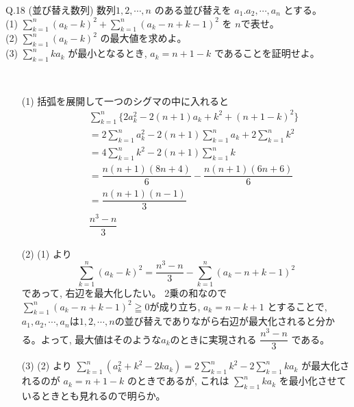 \documentclass[twocolumn]{jsarticle}
\newcommand{\thm}{\begin{itembox}[l]}
\newcommand{\disp}{\displaystyle}
\newcommand{\enthm}{\end{itembox}\\}
\renewcommand{\geq}{\geqq}
\begin{document}
\thm{Q.18 (並び替え数列)}
数列$1,2,\cdots, n$ のある並び替えを $a_1.a_2,\cdots , a_n$ とする。\\
(1) $\disp\sum_{k=1}^n (a_k-k)^2 + \disp\sum_{k=1}^n (a_k-n+k-1)^2$ を $n$で表せ。\\
(2) $\disp\sum_{k=1}^n(a_k-k)^2$ の最大値を求めよ。\\
(3) $\disp\sum_{k=1}^nka_k$ が最小となるとき, $a_k=n+1-k$ であることを証明せよ。
\enthm
\begin{enumerate}
\item[(1)] 括弧を展開して一つのシグマの中に入れると 
\begin{eqnarray*}
&&\disp\sum_{k=1}^n \{2a_k^2-2(n+1)a_k + k^2 + (n+1-k)^2 \}\\
&&=2\disp\sum_{k=1}^na_k^2 -2(n+1)\disp\sum_{k=1}^na_k + 2\disp\sum_{k=1}^n k^2\\
&&=4\disp\sum_{k=1}^nk^2 - 2(n+1) \disp\sum_{k=1}^nk\\
&&=\dfrac{n(n+1)(8n+4)}{6} - \dfrac{n(n+1)(6n+6)}{6}\\
&&=\dfrac{n(n+1)(n-1)}{3}\\
&&\dfrac{n^3-n}{3}
\end{eqnarray*}
\item[(2)] (1) より
\[\disp\sum_{k=1}^n(a_k-k)^2 = \dfrac{n^3-n}{3}-\disp\sum_{k=1}^n (a_k-n+k-1)^2\]
であって, 右辺を最大化したい。 2乗の和なので$\disp\sum_{k=1}^n (a_k-n+k-1)^2\geq 0$が成り立ち, $a_k=n-k+1$ とすることで, $a_1,a_2,\cdots, a_n$は$1,2,\cdots ,n$の並び替えでありながら右辺が最大化されると分かる。よって, 最大値はそのような$a_k$のときに実現される $\dfrac{n^3-n}{3}$ である。
\item[(3)] (2) より $\disp\sum_{k=1}^n (a_k^2+k^2 -2ka_k)=2\disp\sum_{k=1}^n k^2 -2\disp\sum_{k=1}^n ka_k$ が最大化されるのが $a_k=n+1-k$ のときであるが, これは $\disp\sum_{k=1}^n ka_k$ を最小化させているときとも見れるので明らか。
\end{enumerate}
\end{document}
